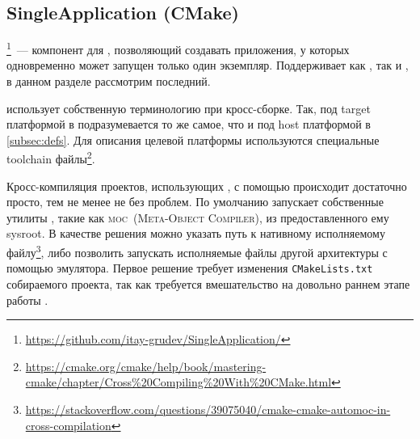 


\subsection{SingleApplication (CMake)}

\singleapp{}\footnote{\url{https://github.com/itay-grudev/SingleApplication/}}~--- компонент для \qt{}, позволяющий создавать приложения, у которых одновременно может запущен только один экземпляр.
Поддерживает как \qmake{}, так и \cmake{}, в данном разделе рассмотрим последний.

\cmake{} использует собственную терминологию при кросс-сборке.
Так, под target платформой в \cmake{} подразумевается то же самое, что и под host платформой в \ref{subsec:defs}.
Для описания целевой платформы используются специальные toolchain файлы\footnote{\url{https://cmake.org/cmake/help/book/mastering-cmake/chapter/Cross\%20Compiling\%20With\%20CMake.html}}.

Кросс-компиляция проектов, использующих \qt{}, с помощью \cmake{} происходит достаточно просто, тем не менее не без проблем.
По умолчанию \cmake{} запускает собственные утилиты \qt{}, такие как \textsc{moc}~(\textsc{Meta-Object Compiler}), из предоставленного ему sysroot.
В качестве решения можно указать путь к нативному исполняемому файлу\footnote{\url{https://stackoverflow.com/questions/39075040/cmake-cmake-automoc-in-cross-compilation}}, либо позволить \cmake{} запускать исполняемые файлы другой архитектуры с помощью эмулятора.
Первое решение требует изменения \texttt{CMakeLists.txt} собираемого проекта, так как требуется вмешательство на довольно раннем этапе работы \cmake{}.

